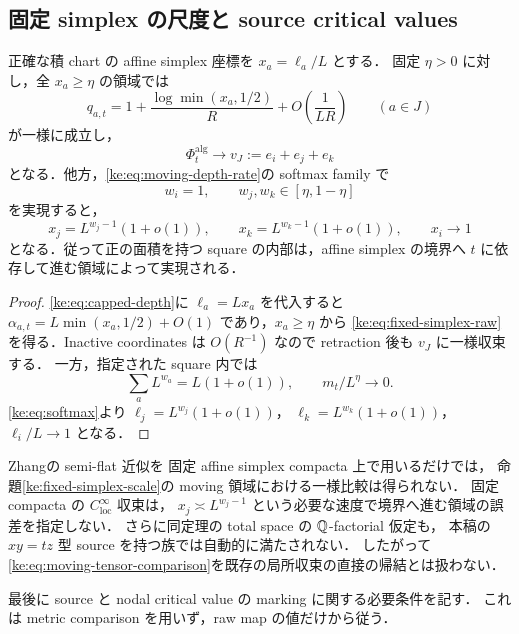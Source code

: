 \subsection{固定 simplex の尺度と source critical values}

\begin{proposition}
\label{ke:fixed-simplex-scale}
正確な積 chart の affine simplex 座標を $x_a=\ell_a/L$ とする．
固定 $\eta>0$ に対し，全 $x_a\ge\eta$ の領域では
\begin{equation}\label{ke:eq:fixed-simplex-raw}
 q_{a,t}
 =1+\frac{\log\min(x_a,1/2)}{R}
      +O\!\left(\frac1{LR}\right)
 \qquad(a\in J)
\end{equation}
が一様に成立し，
\[
 \Phi_t^{\mathrm{alg}}\longrightarrow v_J:=e_i+e_j+e_k
\]
となる．他方，\eqref{ke:eq:moving-depth-rate}の softmax family で
\[
 w_i=1,\qquad w_j,w_k\in[\eta,1-\eta]
\]
を実現すると，
\[
 x_j=L^{w_j-1}(1+o(1)),\qquad
 x_k=L^{w_k-1}(1+o(1)),\qquad x_i\longrightarrow1
\]
となる．従って正の面積を持つ square の内部は，affine simplex の境界へ
$t$ に依存して進む領域によって実現される．
\end{proposition}
\begin{proof}
\eqref{ke:eq:capped-depth}に $\ell_a=Lx_a$ を代入すると
$\alpha_{a,t}=L\min(x_a,1/2)+O(1)$ であり，$x_a\ge\eta$ から
\eqref{ke:eq:fixed-simplex-raw}を得る．Inactive coordinates は $O(R^{-1})$ なので
retraction 後も $v_J$ に一様収束する．
一方，指定された square 内では
\[
 \sum_a L^{w_a}=L(1+o(1)),\qquad m_t/L^\eta\longrightarrow0.
\]
\eqref{ke:eq:softmax}より $\ell_j=L^{w_j}(1+o(1))$，
$\ell_k=L^{w_k}(1+o(1))$，$\ell_i/L\to1$ となる．
\end{proof}

\begin{remark}
Zhang\cite[Theorem~2.4]{ZhangNegativeKE}の semi-flat 近似を
固定 affine simplex compacta 上で用いるだけでは，
命題\ref{ke:fixed-simplex-scale}の moving 領域における一様比較は得られない．
固定 compacta の $C^\infty_{\mathrm{loc}}$ 収束は，
$x_j\asymp L^{w_j-1}$ という必要な速度で境界へ進む領域の誤差を指定しない．
さらに同定理の total space の $\mathbb Q$-factorial 仮定も，
本稿の $xy=tz$ 型 source を持つ族では自動的に満たされない．
したがって\eqref{ke:eq:moving-tensor-comparison}を既存の局所収束の直接の帰結とは扱わない．
\end{remark}

最後に source と nodal critical value の marking に関する必要条件を記す．
これは metric comparison を用いず，raw map の値だけから従う．

